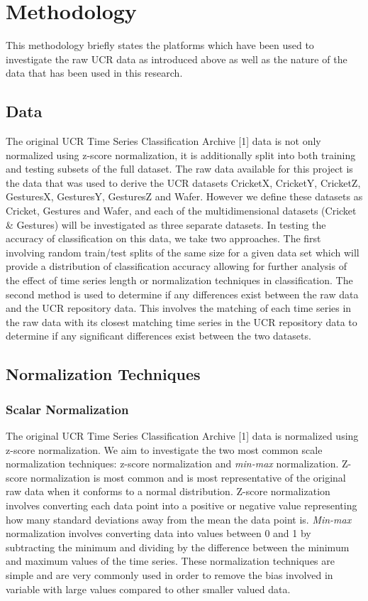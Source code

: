 \documentclass[10pt,a4paper]{article}
\begin{document}
\section{Methodology}

This methodology briefly states the platforms which have been used to investigate the raw UCR data as introduced above as well as the nature of the data that has been used in this research.

\subsection{Data}

The original UCR Time Series Classification Archive [1] data is not only normalized using z-score normalization, it is additionally split into both training and testing subsets of the full dataset. 
The raw data available for this project is the data that was used to derive the UCR datasets CricketX, CricketY, CricketZ, GesturesX, GesturesY, GesturesZ and Wafer.
However we define these datasets as Cricket, Gestures and Wafer, and each of the multidimensional datasets (Cricket \& Gestures) will be investigated as three separate datasets.
In testing the accuracy of classification on this data, we take two approaches.
The first involving random train/test splits of the same size for a given data set which will provide a distribution of classification accuracy allowing for further analysis of the effect of time series length or normalization techniques in classification.
The second method is used to determine if any differences exist between the raw data and the UCR repository data.
This involves the matching of each time series in the raw data with its closest matching time series in the UCR repository data to determine if any significant differences exist between the two datasets.

\subsection{Normalization Techniques}

\subsubsection{Scalar Normalization}

The original UCR Time Series Classification Archive [1] data is normalized using z-score normalization.
We aim to investigate the two most common scale normalization techniques: z-score normalization and \textit{min-max} normalization.
Z-score normalization is most common and is most representative of the original raw data when it conforms to a normal distribution.
Z-score normalization involves converting each data point into a positive or negative value representing how many standard deviations away from the mean the data point is.
\textit{Min-max} normalization involves converting data into values between 0 and 1 by subtracting the minimum and dividing by the difference between the minimum and maximum values of the time series.
These normalization techniques are simple and are very commonly used in order to remove the bias involved in variable with large values compared to other smaller valued data.
\end{document}
